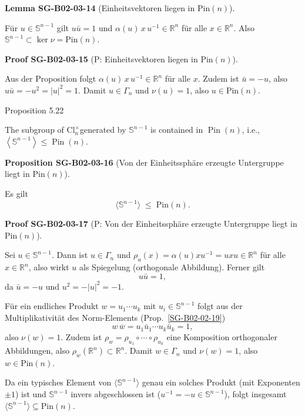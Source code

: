 \documentclass[10pt, letterpaper]{article}
\newcommand{\R}{\mathbb{R}}
\newcommand{\Pin}{\mathrm{Pin}}
\newcommand{\CustomHeading}[3]{%
  \par\medskip\noindent%
  \textbf{#1 #2} \textnormal{(#3)}.\enskip%
}
\newenvironment{PROP}[2]{\begin{unitbox}\CustomHeading{Proposition}{#1}{#2}}{\end{unitbox}}
\newenvironment{LEM}[2]{\begin{unitbox}\CustomHeading{Lemma}{#1}{#2}}{\end{unitbox}}
\newenvironment{PROOF}[2]{\begin{unitbox}\CustomHeading{Proof}{#1}{#2}}{\end{unitbox}}
\begin{document}
\begin{LEM}{SG-B02-03-14}{Einheitsvektoren liegen in \(\Pin(n)\)}
Für \(u\in \mathbb S^{n-1}\) gilt \(u\bar u=1\) und \(\alpha(u)\,x\,u^{-1}\in \R^n\) für alle \(x\in\R^n\).
Also \(\mathbb S^{n-1}\subset \ker\nu=\Pin(n)\).
\end{LEM}



\begin{PROOF}{SG-B02-03-15}{P: Einheitsvektoren liegen in \(\Pin(n)\)}
Aus der Proposition folgt \(\alpha(u)\,x\,u^{-1}\in\R^n\) für alle \(x\).
Zudem ist \(\bar u=-u\), also \(u\bar u=-u^2=|u|^2=1\). Damit \(u\in \Gamma_n\) und \(\nu(u)=1\), also \(u\in \Pin(n)\).
\end{PROOF}





Proposition 5.22


The subgroup of $\mathrm{Cl}_{n}^{\times}$generated by $\mathbb{S}^{n-1}$ is contained in $\operatorname{Pin}(n)$, i.e., $\left\langle\mathbb{S}^{n-1}\right\rangle \leqslant \operatorname{Pin}(n)$.


\begin{PROP}{SG-B02-03-16}{Von der Einheitssphäre erzeugte Untergruppe liegt in \(\Pin(n)\)}
Es gilt
\[
\langle \mathbb S^{n-1}\rangle \;\leqslant\; \Pin(n).
\]
\end{PROP}



\begin{PROOF}{SG-B02-03-17}{P: Von der Einheitssphäre erzeugte Untergruppe liegt in \(\Pin(n)\)}
Sei \(u\in \mathbb S^{n-1}\). Dann ist \(u\in\Gamma_n\) und \(\rho_u(x)=\alpha(u)xu^{-1}=u x u\in\R^n\) für alle \(x\in\R^n\), also wirkt \(u\) als Spiegelung (orthogonale Abbildung). Ferner gilt
\[
u\bar u = 1,
\]
da \(\bar u=-u\) und \(u^2=-|u|^2=-1\).

Für ein endliches Produkt \(w=u_1\cdots u_k\) mit \(u_i\in\mathbb S^{n-1}\) folgt aus der Multiplikativität des Norm-Elements (Prop.~\ref{SG-B02-02-19})
\[
w\,\overline{w}=u_1\bar u_1\cdots u_k\bar u_k=1,
\]
also \(\nu(w)=1\). Zudem ist \(\rho_w=\rho_{u_1}\circ\cdots\circ \rho_{u_k}\) eine Komposition orthogonaler Abbildungen, also \(\rho_w(\R^n)\subset \R^n\). Damit \(w\in\Gamma_n\) und \(\nu(w)=1\), also \(w\in\Pin(n)\).

Da ein typisches Element von \(\langle \mathbb S^{n-1}\rangle\) genau ein solches Produkt (mit Exponenten \(\pm1\)) ist und \(\mathbb S^{n-1}\) invers abgeschlossen ist (\(u^{-1}=-u\in\mathbb S^{n-1}\)), folgt insgesamt
\(\langle \mathbb S^{n-1}\rangle \subseteq \Pin(n)\).
\end{PROOF}
\end{document}
